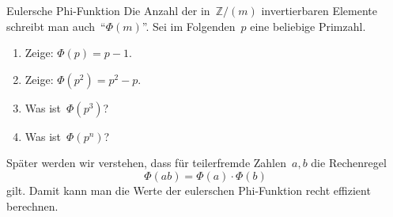 \documentclass{zirkelblatt}
\newcommand{\ZZ}{\mathbb{Z}}
\begin{document}
\newpage
\begin{aufgabe}{Eulersche Phi-Funktion}
Die Anzahl der in~$\ZZ/(m)$ invertierbaren Elemente schreibt man
auch~"`$\Phi(m)$"'. Sei im Folgenden~$p$ eine beliebige Primzahl.
\begin{enumerate}
\item Zeige: $\Phi(p) = p - 1$.
\item Zeige: $\Phi(p^2) = p^2 - p$.
\item Was ist~$\Phi(p^3)$?
\item Was ist~$\Phi(p^n)$?
\end{enumerate}
Später werden wir verstehen, dass für teilerfremde Zahlen~$a,b$ die Rechenregel
\[ \Phi(ab) = \Phi(a) \cdot \Phi(b) \]
gilt. Damit kann man die Werte der eulerschen Phi-Funktion recht effizient
berechnen.
\end{aufgabe}
\end{document}
